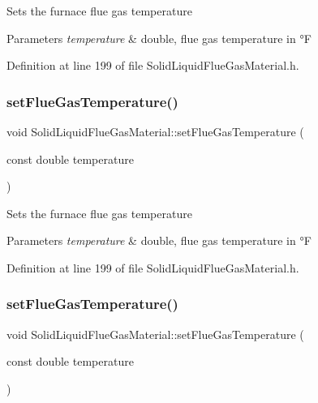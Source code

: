Sets the furnace flue gas temperature 
\begin{DoxyParams}{Parameters}
{\em temperature} & double, flue gas temperature in °F \\
\hline
\end{DoxyParams}


Definition at line 199 of file Solid\+Liquid\+Flue\+Gas\+Material.\+h.

\mbox{\label{class_solid_liquid_flue_gas_material_ae647700dbff5ccea7938b2117f2c3156}} 
\subsubsection{\texorpdfstring{set\+Flue\+Gas\+Temperature()}{setFlueGasTemperature()}\hspace{0.1cm}{\footnotesize\ttfamily [2/3]}}
{\footnotesize\ttfamily void Solid\+Liquid\+Flue\+Gas\+Material\+::set\+Flue\+Gas\+Temperature (\begin{DoxyParamCaption}\item[{const double}]{temperature }\end{DoxyParamCaption})\hspace{0.3cm}{\ttfamily [inline]}}

Sets the furnace flue gas temperature 
\begin{DoxyParams}{Parameters}
{\em temperature} & double, flue gas temperature in °F \\
\hline
\end{DoxyParams}


Definition at line 199 of file Solid\+Liquid\+Flue\+Gas\+Material.\+h.

\mbox{\label{class_solid_liquid_flue_gas_material_ae647700dbff5ccea7938b2117f2c3156}} 
\subsubsection{\texorpdfstring{set\+Flue\+Gas\+Temperature()}{setFlueGasTemperature()}\hspace{0.1cm}{\footnotesize\ttfamily [3/3]}}
{\footnotesize\ttfamily void Solid\+Liquid\+Flue\+Gas\+Material\+::set\+Flue\+Gas\+Temperature (\begin{DoxyParamCaption}\item[{const double}]{temperature }\end{DoxyParamCaption})\hspace{0.3cm}{\ttfamily [inline]}}


